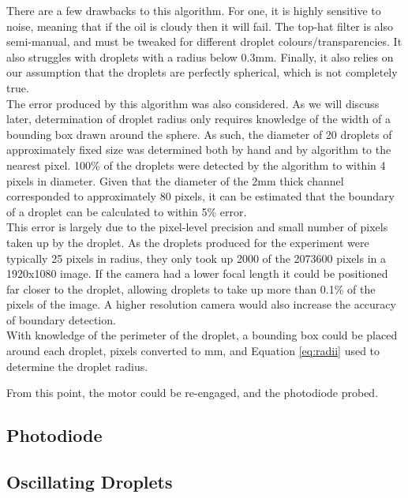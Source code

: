 \documentclass{physics_article_B}
\begin{document}
        There are a few drawbacks to this algorithm. For one, it is highly sensitive to noise, meaning that if the oil is cloudy then it will fail. The top-hat filter is also semi-manual, and must be tweaked for different droplet colours/transparencies. It also struggles with droplets with a radius below 0.3mm. Finally, it also relies on our assumption that the droplets are perfectly spherical, which is not completely true.\\
        
        The error produced by this algorithm was also considered. As we will discuss later, determination of droplet radius only requires knowledge of the width of a bounding box drawn around the sphere. As such, the diameter of 20 droplets of approximately fixed size was determined both by hand and by algorithm to the nearest pixel. 100\% of the droplets were detected by the algorithm to within 4 pixels in diameter. Given that the diameter of the 2mm thick channel corresponded to approximately 80 pixels, it can be estimated that the boundary of a droplet can be calculated to within 5\% error. \\
        
        This error is largely due to the pixel-level precision and small number of pixels taken up by the droplet. As the droplets produced for the experiment were typically 25 pixels in radius, they only took up 2000 of the 2073600 pixels in a 1920x1080 image. If the camera had a lower focal length it could be positioned far closer to the droplet, allowing droplets to take up more than 0.1\% of the pixels of the image. A higher resolution camera would also increase the accuracy of boundary detection. \\
        
        With knowledge of the perimeter of the droplet, a bounding box could be placed around each droplet, pixels converted to mm, and Equation \ref{eq:radii} used to determine the droplet radius.
        
        From this point, the motor could be re-engaged, and the photodiode probed.
    
    \subsection{Photodiode}
    
    \subsection{Oscillating Droplets}
\end{document}
